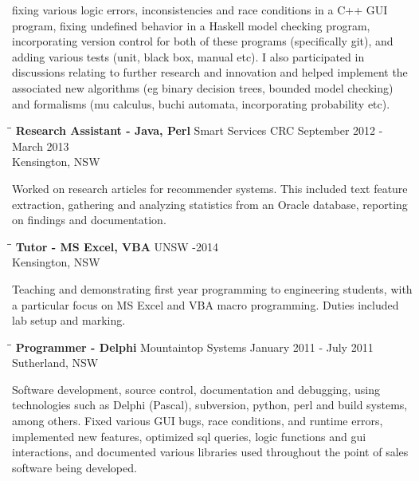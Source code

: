\documentclass{res}
\begin{document}
\begin{resume}
    fixing various logic errors, inconsistencies and race conditions in a C++
    GUI program, fixing undefined behavior in a Haskell model checking program,
    incorporating version control for both of these programs (specifically
    git), and adding various tests (unit, black box, manual etc). I also
    participated in discussions relating to further research and innovation and
    helped implement the associated new algorithms (eg binary decision trees,
    bounded model checking) and formalisms (mu calculus, buchi automata,
    incorporating probability etc).
   \begin{tabbing}
   \hspace{2.3in}\= \hspace{2.6in}\= \kill %
    {\bf Research Assistant - Java, Perl} \>Smart Services CRC \>September 2012 - March 2013\\
                                          \>Kensington, NSW
   \end{tabbing}\vspace{-20pt}      %
    Worked on research articles for recommender systems. This included text
    feature extraction, gathering and analyzing statistics from an Oracle
    database, reporting on findings and documentation.
   \begin{tabbing}
   \hspace{2.3in}\= \hspace{2.6in}\= \kill %
    {\bf Tutor - MS Excel, VBA} \>UNSW     -2014\\
                                \>Kensington, NSW
   \end{tabbing}\vspace{-20pt}      %
    Teaching and demonstrating first year programming to engineering students,
    with a particular focus on MS Excel and VBA macro programming. Duties
    included lab setup and marking.
   \begin{tabbing}
   \hspace{2.3in}\= \hspace{2.6in}\= \kill %
    {\bf Programmer - Delphi} \>Mountaintop Systems \> January 2011 - July 2011\\
                              \>Sutherland, NSW
   \end{tabbing}\vspace{-20pt}
    Software development, source control, documentation and debugging,
    using technologies such as Delphi (Pascal), subversion, python, perl and
    build systems, among others. Fixed various GUI bugs, race conditions, and
    runtime errors, implemented new features, optimized sql queries, logic
    functions and gui interactions, and documented various libraries used
    throughout the point of sales software being developed.



\end{resume}
\end{document}
